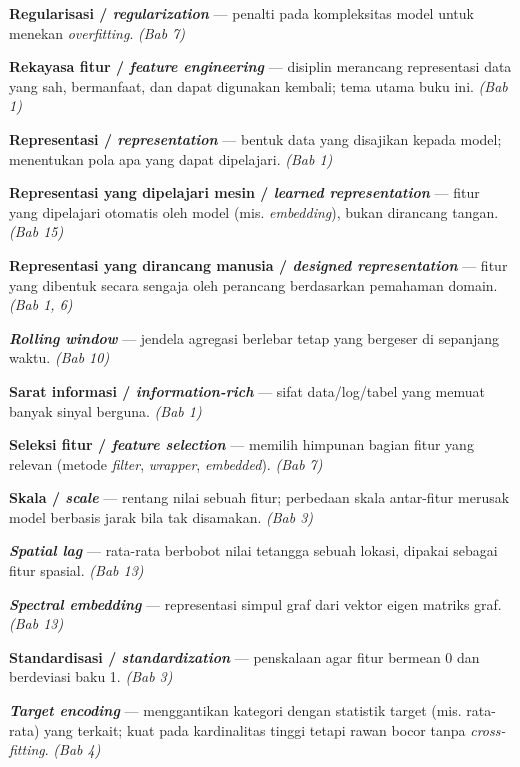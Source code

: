 \textbf{Regularisasi / \emph{regularization}} --- penalti pada kompleksitas model untuk
menekan \emph{overfitting}. \emph{(Bab 7)}

\textbf{Rekayasa fitur / \emph{feature engineering}} --- disiplin merancang representasi data
yang sah, bermanfaat, dan dapat digunakan kembali; tema utama buku ini. \emph{(Bab 1)}

\textbf{Representasi / \emph{representation}} --- bentuk data yang disajikan kepada model;
menentukan pola apa yang dapat dipelajari. \emph{(Bab 1)}

\textbf{Representasi yang dipelajari mesin / \emph{learned representation}} --- fitur yang
dipelajari otomatis oleh model (mis. \emph{embedding}), bukan dirancang tangan.
\emph{(Bab 15)}

\textbf{Representasi yang dirancang manusia / \emph{designed representation}} --- fitur yang
dibentuk secara sengaja oleh perancang berdasarkan pemahaman domain. \emph{(Bab 1, 6)}

\textbf{\emph{Rolling window}} --- jendela agregasi berlebar tetap yang bergeser di sepanjang
waktu. \emph{(Bab 10)}


\textbf{Sarat informasi / \emph{information-rich}} --- sifat data/log/tabel yang memuat
banyak sinyal berguna. \emph{(Bab 1)}

\textbf{Seleksi fitur / \emph{feature selection}} --- memilih himpunan bagian fitur yang
relevan (metode \emph{filter}, \emph{wrapper}, \emph{embedded}). \emph{(Bab 7)}

\textbf{Skala / \emph{scale}} --- rentang nilai sebuah fitur; perbedaan skala antar-fitur
merusak model berbasis jarak bila tak disamakan. \emph{(Bab 3)}

\textbf{\emph{Spatial lag}} --- rata-rata berbobot nilai tetangga sebuah lokasi, dipakai
sebagai fitur spasial. \emph{(Bab 13)}

\textbf{\emph{Spectral embedding}} --- representasi simpul graf dari vektor eigen matriks graf.
\emph{(Bab 13)}

\textbf{Standardisasi / \emph{standardization}} --- penskalaan agar fitur bermean 0 dan
berdeviasi baku 1. \emph{(Bab 3)}


\textbf{\emph{Target encoding}} --- menggantikan kategori dengan statistik target (mis.
rata-rata) yang terkait; kuat pada kardinalitas tinggi tetapi rawan bocor tanpa
\emph{cross-fitting}. \emph{(Bab 4)}

